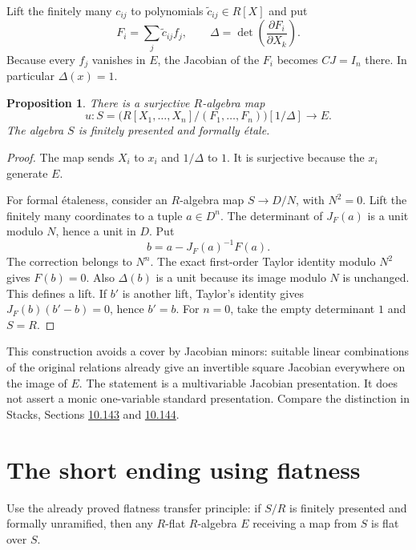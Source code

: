 \documentclass[11pt]{article}
\newtheorem{proposition}[theorem]{Proposition}
\begin{document}
Lift the finitely many $c_{ij}$ to polynomials $\widetilde c_{ij}\in R[X]$
and put
\[
       F_i=\sum_j\widetilde c_{ij}f_j,\qquad
       \Delta=\det\left(\frac{\partial F_i}{\partial X_k}\right).
\]
Because every $f_j$ vanishes in $E$, the Jacobian of the $F_i$ becomes
$CJ=I_n$ there. In particular $\Delta(x)=1$.

\begin{proposition}\label{prop:source}
There is a surjective $R$-algebra map
\[
       u:S=\bigl(R[X_1,\ldots,X_n]/(F_1,\ldots,F_n)\bigr)[1/\Delta]
           \longrightarrow E.
\]
The algebra $S$ is finitely presented and formally \'etale.
\end{proposition}
\begin{proof}
The map sends $X_i$ to $x_i$ and $1/\Delta$ to $1$. It is surjective
because the $x_i$ generate $E$.

For formal \'etaleness, consider an $R$-algebra map $S\to D/N$, with
$N^2=0$. Lift the finitely many coordinates to a tuple $a\in D^n$.
The determinant of $J_F(a)$ is a unit modulo $N$, hence a unit in $D$.
Put
\[
                    b=a-J_F(a)^{-1}F(a).
\]
The correction belongs to $N^n$. The exact first-order Taylor identity
modulo $N^2$ gives $F(b)=0$. Also $\Delta(b)$ is a unit because its
image modulo $N$ is unchanged. This defines a lift. If $b'$ is another
lift, Taylor's identity gives $J_F(b)(b'-b)=0$, hence $b'=b$.
For $n=0$, take the empty determinant $1$ and $S=R$.
\end{proof}

This construction avoids a cover by Jacobian minors: suitable linear
combinations of the original relations already give an invertible square
Jacobian everywhere on the image of $E$. The statement is a multivariable
Jacobian presentation. It does not assert a monic one-variable standard
presentation. Compare the distinction in Stacks, Sections
\href{https://stacks.math.columbia.edu/tag/00U0}{10.143} and
\href{https://stacks.math.columbia.edu/tag/0G1A}{10.144}.

\section{The short ending using flatness}

Use the already proved flatness transfer principle: if $S/R$ is finitely
presented and formally unramified, then any $R$-flat $R$-algebra $E$
receiving a map from $S$ is flat over $S$.
\end{document}
